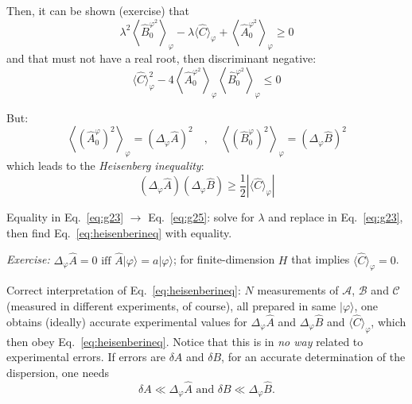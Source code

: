 \documentclass[12pt]{article}
\begin{document}
\begin{enumerate}
%
Then, it can be shown (exercise) that
\begin{equation}
\lambda^{2}\left\langle\hat{B}_{0}^{\varphi^2}\right\rangle_{\varphi}-
\lambda\langle\hat{C}\rangle_{\varphi}+
\left\langle\hat{A}_{0}^{\varphi^{2}}\right\rangle_{\varphi} \geqslant 0
\label{eq:g24}
\end{equation}
and that must not have a real root, then discriminant negative:
\begin{equation}
\langle\hat{C}\rangle_{\varphi}^{2}-4
\left\langle\hat{A}_{0}^{\varphi^{2}}\right\rangle_{\varphi}
\left\langle\hat{B}_{0}^{\varphi^{2}}\right\rangle_{\varphi} \leqslant 0
\label{eq:g25}
\end{equation}
%
\end{enumerate}

But:
\begin{equation}
\left\langle\left(\hat{A}_{0}^{\varphi}\right)^{2}\right\rangle_{\varphi}
=\left(\Delta_{\varphi} \hat{A}\right)^{2}
\quad,\quad
\left\langle\left(\hat{B}_{0}^{\varphi}\right)^{2}\right\rangle_{\varphi}
=\left(\Delta_{\varphi} \hat{B}\right)^{2}
\end{equation}
which leads to the \emph{Heisenberg inequality}:
\begin{equation}
\boxed{
\left(\Delta_{\varphi} \hat{A}\right)\left(\Delta_{\varphi} \hat{B}\right) \geqslant \frac{1}{2}\left|\langle\hat{C}\rangle_{\varphi}\right|
}
\label{eq:heisenberineq}
\end{equation}

Equality in Eq.~\eqref{eq:g23} $\to$ Eq.~\eqref{eq:g25}: solve for $\lambda$ and replace in Eq.~\eqref{eq:g23},
then find Eq.~\eqref{eq:heisenberineq} with equality.

\emph{Exercise:} 
$\Delta_\varphi \hat{A}=0 \textrm{ iff } \hat{A}|\varphi\rangle=a|\varphi\rangle$; 
for finite-dimension $H$ that implies 
$\langle\hat{C}\rangle_{\varphi}=0$.

Correct interpretation of Eq.~\eqref{eq:heisenberineq}:
$N$ measurements of $\mathcal{A}$, $\mathcal{B}$ and $\mathcal{C}$ (measured in different
experiments, of course), all prepared in same $|\varphi\rangle$,
one obtains (ideally) accurate experimental values for 
$\Delta_{\varphi} \hat{A}$ and 
$\Delta_{\varphi} \hat{B}$ and
$\langle\hat{C}\rangle_{\varphi}$,
which then obey Eq.~\eqref{eq:heisenberineq}. 
Notice that this is in \emph{no way} related to experimental errors.
If errors are $\delta A$ and $\delta B$, for an accurate
determination of the dispersion, one needs
\begin{equation}
\delta A \ll \Delta_{\varphi} \hat{A} \textrm { and } \delta B \ll \Delta_{\varphi} \hat{B}.
\end{equation}
\end{document}
